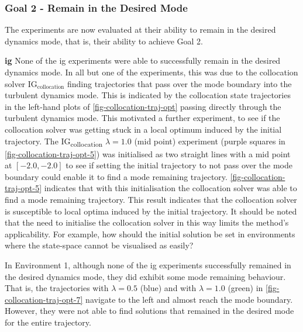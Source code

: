 \documentclass{mimosis-class/mimosis}
\numberwithin{equation}{chapter}
\begin{document}
{\subsubsection{Goal 2 - Remain in the Desired Mode}
\label{sec:orgefd7d56}
The experiments are now evaluated at their ability to remain in the desired dynamics mode,
that is, their ability to achieve Goal 2.
\newline

\textbf{\acrfull{ig}}
None of the \acrshort{ig} experiments were able to successfully remain in the desired dynamics mode.
In all but one of the experiments, this was due to the collocation solver
\(\text{IG}_{\text{collocation}}\) finding trajectories that pass over the mode boundary into
the turbulent dynamics mode.
This is indicated by the collocation state trajectories in the left-hand plots of \cref{fig-collocation-traj-opt}
passing directly through the turbulent dynamics mode.
This motivated a further experiment, to see if the collocation solver was getting stuck in a local optimum
induced by the initial trajectory.
The IG\textsubscript{collocation} \(\lambda=1.0\) (mid point) experiment
(purple squares in \cref{fig-collocation-traj-opt-5}) was initialised as two straight lines with a
mid point at \([-2.0, -2.0]\) to see if
setting the initial trajectory to not pass over the mode boundary could enable it to find a mode remaining
trajectory.
\cref{fig-collocation-traj-opt-5} indicates that with this initialisation the collocation solver was able to
find a mode remaining trajectory.
This result indicates that the collocation solver is susceptible to local optima induced by the initial trajectory.
It should be noted that the need to initialise the collocation solver in this way
limits the method's applicability.
For example, how should the initial solution be set in environments where the state-space cannot
be visualised as easily?

In Environment 1, although none of the \acrshort{ig}
experiments successfully remained in the desired dynamics mode, they did exhibit some mode remaining behaviour.
That is, the trajectories with \(\lambda=0.5\) (blue) and with \(\lambda=1.0\) (green) in \cref{fig-collocation-traj-opt-7}
navigate to the left and almost reach the mode boundary.
However, they were not able to find solutions that remained in the desired mode for the entire trajectory.



}
\end{document}
